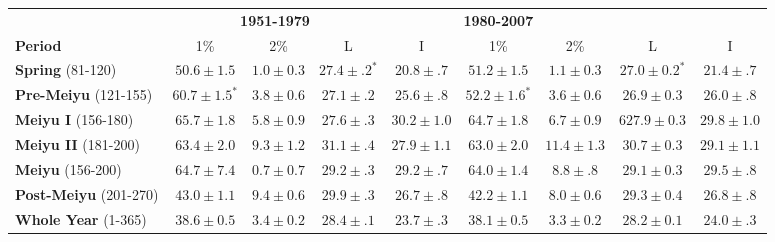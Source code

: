 \documentclass[draft,grl]{AGUTeX}
\begin{document}
\begin{table}
\begin{tabular}{ l c c c c c c c c}
	& \multicolumn{3}{c}{\textbf{1951-1979}} & \multicolumn{3}{c}{\textbf{1980-2007}} \\
	\textbf{Period} & 1\% & 2\% & L & I & 1\% & 2\% & L & I \\
	\hline	
	\textbf{Spring} (81-120) & $50.6 \pm 1.5$ & $1.0 \pm 0.3$ & $\boldsymbol{27.4 \pm .2^*}$ & $20.8 \pm .7$ & $51.2 \pm 1.5$ & $1.1 \pm 0.3$ & $\boldsymbol{27.0 \pm 0.2^*}$ & $21.4 \pm .7$ \\
	\textbf{Pre-Meiyu} (121-155) & $\boldsymbol{60.7 \pm 1.5^*}$ & $3.8 \pm 0.6$ & $27.1 \pm .2$ & $25.6 \pm .8$ & $\boldsymbol{52.2 \pm 1.6^*}$ & $3.6 \pm 0.6$ & $26.9 \pm 0.3$ & $26.0 \pm .8$\\
	\textbf{Meiyu I} (156-180) &	$65.7 \pm 1.8$ & $5.8 \pm 0.9$ & $27.6 \pm .3$ & $30.2 \pm 1.0$ & $64.7 \pm 1.8$  & $6.7 \pm 0.9$ & 6$ 27.9 \pm 0.3$ & $29.8 \pm 1.0$ \\
	\textbf{Meiyu II} (181-200) & $63.4 \pm 2.0$ & $9.3 \pm 1.2$ & $31.1 \pm .4$ & $27.9 \pm 1.1$ & $63.0 \pm 2.0$ & $11.4 \pm 1.3$ & $30.7 \pm 0.3$ & $29.1 \pm 1.1$ \\
	\textbf{Meiyu} (156-200) & $64.7 \pm 7.4$ & $0.7 \pm 0.7$ & $29.2 \pm .3$ & $29.2 \pm .7$ & $64.0 \pm 1.4$ & $8.8 \pm .8$ & $29.1 \pm 0.3$ & $29.5 \pm .8$\\
	\textbf{Post-Meiyu} (201-270) & $43.0 \pm 1.1 $ & $9.4 \pm 0.6$ & $\boldsymbol{29.9 \pm .3}$ & $26.7 \pm .8$ & $42.2 \pm 1.1$ & $8.0 \pm 0.6$ & $\boldsymbol{29.3 \pm 0.4}$ &  $26.8 \pm .8$ \\
	\textbf{Whole Year} (1-365) & $38.6 \pm 0.5 $ & $3.4 \pm 0.2 $ & $\boldsymbol{28.4 \pm .1}$ & $23.7 \pm .3$ & $38.1 \pm 0.5$ & $3.3 \pm 0.2$ & $\boldsymbol{28.2 \pm 0.1} $ & $24.0 \pm .3$\\
\end{tabular}

\label{changes_table}
\end{table}
\end{document}
